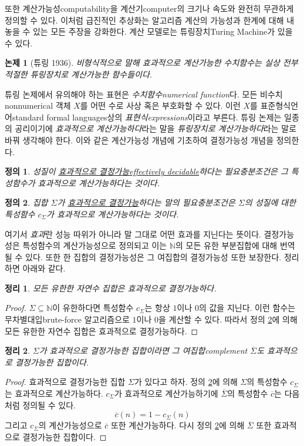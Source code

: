 \documentclass[a4paper,chapter,atbegshi]{oblivoir}
\newtheorem{defn}{정의}[chapter]
\newtheorem{theo}{정리}[chapter]
\newtheorem{thes}{논제}[chapter]
\begin{document}
또한 계산가능성{\tiny computability}을 계산기{\tiny computer}의 크기나 속도와
완전히 무관하게 정의할 수 있다. 이처럼 급진적인 추상화는 알고리즘 계산의
가능성과 한계에 대해 내놓을 수 있는 모든 주장을 강화한다. 계산 모델로는
튜링장치{\tiny Turing Machine}가 있을 수 있다.
\begin{thes}[튜링 1936]
  비형식적으로 말해 효과적으로 계산가능한 수치함수는 실상 전부 적절한 튜링장치로
  계산가능한 함수들이다.
\end{thes}
튜링 논제에서 유의해야 하는 표현은 \emph{수치함수\tiny numerical function}다. 
모든 비수치{\tiny nonnumerical} 객체 $X$를 어떤 수로 사상 혹은 부호화할 수 있다.
이런 $X$를 표준형식언어{\tiny standard formal languages}상의 
\emph{표현식\tiny expressions}이라고 부른다. 튜링 논제는 일종의 공리이기에
\emph{효과적으로 계산가능하다}라는 말을 \emph{튜링장치로 계산가능하다}라는
말로 바꿔 생각해야 한다. 이와 같은 계산가능성 개념에 기초하여 결정가능성 개념을
정의한다.
\begin{defn}\label{defn:11}
  성질이 \underline{효과적으로 결정가능\tiny effectively decidable}하다는 
  필요충분조건은 그 특성함수가 효과적으로 계산가능하다는 것이다.
\end{defn}
\begin{defn}\label{defn:12}
  집합 $\Sigma$가 \underline{효과적으로 결정가능}하다는 말의 필요충분조건은
  $\Sigma$의 성질에 대한 특성함수 $c_{\Sigma}$가 효과적으로 계산가능하다는
  것이다.
\end{defn}
여기서 \emph{효과}란 성능 따위가 아니라 말 그대로 어떤 효과를 지닌다는
뜻이다. 결정가능성은 특성함수의 계산가능성으로 정의되고 이는 $\mathbb{N}$의
모든 유한 부분집합에 대해 번역될 수 있다. 또한 한 집합의 결정가능성은
그 여집합의 결정가능성 또한 보장한다. 정리하면 아래와 같다.
\begin{theo}
  모든 유한한 자연수 집합은 효과적으로 결정가능하다.
\end{theo}
\begin{proof}
  $\Sigma\subseteq\mathbb{N}$이 유한하다면 특성함수 $c_{\Sigma}$는 항상 $1$이나
  $0$의 값을 지닌다. 이런 함수는 무차별대입{\tiny brute-force} 알고리즘으로
  $1$이나 $0$을 계산할 수 있다. 따라서 정의 \ref{defn:12}에 의해 모든 유한한
  자연수 집합은 효과적으로 결정가능하다.
\end{proof}
\begin{theo}\label{theo:14}
  $\Sigma$가 효과적으로 결정가능한 집합이라면 그 여집합{\tiny complement}
  $\overline{\Sigma}$도 효과적으로 결정가능한 집합이다.
\end{theo}
\begin{proof}
  효과적으로 결정가능한 집합 $\Sigma$가 있다고 하자. 정의 \ref{defn:12}에 의해
  $\Sigma$의 특성함수 $c_{\Sigma}$는 효과적으로 계산가능하다. $c_{\Sigma}$가
  효과적으로 계산가능하기에 $\overline{\Sigma}$의
  특성함수 $\overline{c}$는 다음처럼 정의될 수 있다.
  \[
    \overline{c}(n) = 1-c_{\Sigma}(n)
  \]
  그리고 $c_{\Sigma}$의 계산가능성으로 $\overline{c}$ 또한 계산가능하다.
  다시 정의 \ref{defn:12}에 의해 $\overline{\Sigma}$ 또한 효과적으로 결정가능한
  집합이다.
\end{proof}
\end{document}
